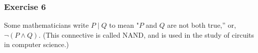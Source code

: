 
\subsubsection{Exercise 6}
\question Some mathematicians write $P\; |\; Q$ to mean "$P$ and $Q$ are not both true,” or, $\neg (P \wedge Q)$.  (This connective is called NAND, and is used in the study of circuits in computer science.)
    
